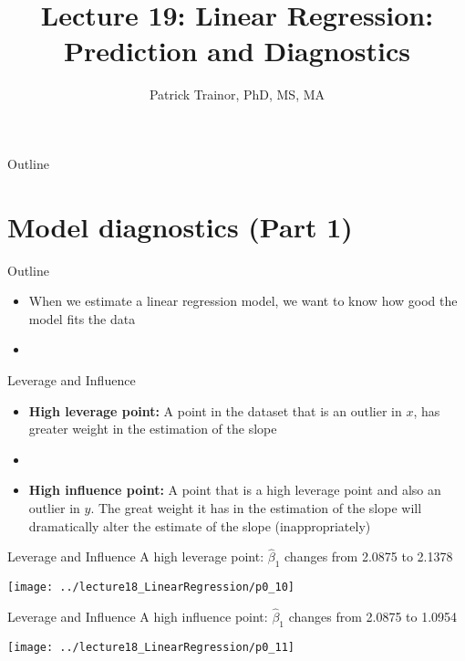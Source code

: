 \documentclass[xcolor=dvipsnames]{beamer}
\title[Lecture 19]{Lecture 19: Linear Regression: Prediction and Diagnostics}
\author[Patrick Trainor]{Patrick Trainor, PhD, MS, MA}
\institute[NMSU]{New Mexico State University}
\date{}
\begin{document}
\begin{frame}
\maketitle
\end{frame}

\begin{frame}{Outline}
\tableofcontents[hideallsubsections]
\end{frame}

\section{Model diagnostics (Part 1)}
\begin{frame}{Outline}
\tableofcontents[currentsection,subsectionstyle=show/shaded/hide]
\end{frame}

\begin{frame}
	\begin{itemize}
		\item When we estimate a linear regression model, we want to know how good the model fits the data
		\item[]
	\end{itemize}
\end{frame}

\begin{frame}{Leverage and Influence}
	\begin{itemize}
		\item \textbf{High leverage point:} A point in the dataset that is an outlier in $x$, has greater weight in the estimation of the slope \pause
		\item[]
		\item \textbf{High influence point:} A point that is a high leverage point and also an outlier in $y$. The great weight it has in the estimation of the slope will dramatically alter the estimate of the slope (inappropriately)
	\end{itemize}
\end{frame}

\begin{frame}{Leverage and Influence}
A high leverage point: $\hat{\beta}_1$ changes from 2.0875 to 2.1378
	\begin{center}
		\texttt{[image: ../lecture18\_LinearRegression/p0\_10]}
	\end{center}
\end{frame}

\begin{frame}{Leverage and Influence}
A high influence point: $\hat{\beta}_1$ changes from 2.0875 to 1.0954
\begin{center}
	\texttt{[image: ../lecture18\_LinearRegression/p0\_11]}
\end{center}
\end{frame}
\end{document}
